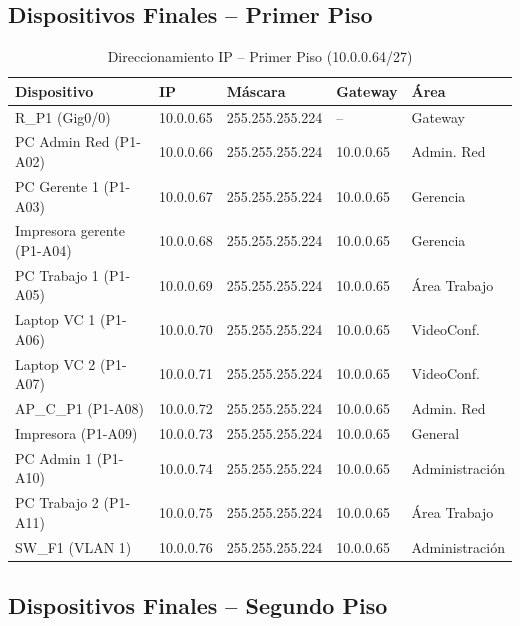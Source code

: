\documentclass[letterpaper,11pt]{article}
\begin{document}
\subsection{Dispositivos Finales -- Primer Piso}

\begin{table}[H]
\centering
\caption{Direccionamiento IP -- Primer Piso (10.0.0.64/27)}
\small
\begin{tabular}{|l|l|l|l|l|}
\hline
\textbf{Dispositivo} & \textbf{IP} & \textbf{Máscara} & \textbf{Gateway} & \textbf{Área} \\
\hline
R\_P1 (Gig0/0) & 10.0.0.65 & 255.255.255.224 & -- & Gateway \\
PC Admin Red (P1-A02) & 10.0.0.66 & 255.255.255.224 & 10.0.0.65 & Admin. Red \\
PC Gerente 1 (P1-A03) & 10.0.0.67 & 255.255.255.224 & 10.0.0.65 & Gerencia \\
Impresora gerente (P1-A04) & 10.0.0.68 & 255.255.255.224 & 10.0.0.65 & Gerencia \\
PC Trabajo 1 (P1-A05) & 10.0.0.69 & 255.255.255.224 & 10.0.0.65 & Área Trabajo \\
Laptop VC 1 (P1-A06) & 10.0.0.70 & 255.255.255.224 & 10.0.0.65 & VideoConf. \\
Laptop VC 2 (P1-A07) & 10.0.0.71 & 255.255.255.224 & 10.0.0.65 & VideoConf. \\
AP\_C\_P1 (P1-A08) & 10.0.0.72 & 255.255.255.224 & 10.0.0.65 & Admin. Red \\
Impresora (P1-A09) & 10.0.0.73 & 255.255.255.224 & 10.0.0.65 & General \\
PC Admin 1 (P1-A10) & 10.0.0.74 & 255.255.255.224 & 10.0.0.65 & Administración \\
PC Trabajo 2 (P1-A11) & 10.0.0.75 & 255.255.255.224 & 10.0.0.65 & Área Trabajo \\
SW\_F1 (VLAN 1) & 10.0.0.76 & 255.255.255.224 & 10.0.0.65 & Administración \\
\hline
\end{tabular}
\end{table}

\subsection{Dispositivos Finales -- Segundo Piso}
\end{document}
